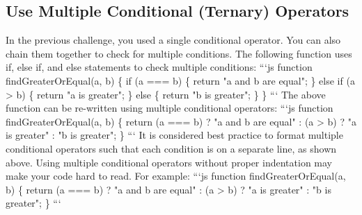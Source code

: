 \documentclass{article}%
\begin{document}
\subsection{Use Multiple Conditional (Ternary) Operators}%
\label{subsec:UseMultipleConditional(Ternary)Operators}%
In the previous challenge, you used a single conditional operator. You can also chain them together to check for multiple conditions.\newline%
The following function uses if, else if, and else statements to check multiple conditions:\newline%
```js\newline%
function findGreaterOrEqual(a, b) \{\newline%
  if (a === b) \{\newline%
    return "a and b are equal";\newline%
  \}\newline%
  else if (a > b) \{\newline%
    return "a is greater";\newline%
  \}\newline%
  else \{\newline%
    return "b is greater";\newline%
  \}\newline%
\}\newline%
```\newline%
The above function can be re{-}written using multiple conditional operators:\newline%
```js\newline%
function findGreaterOrEqual(a, b) \{\newline%
  return (a === b) ? "a and b are equal" \newline%
    : (a > b) ? "a is greater" \newline%
    : "b is greater";\newline%
\}\newline%
```\newline%
It is considered best practice to format multiple conditional operators such that each condition is on a separate line, as shown above. Using multiple conditional operators without proper indentation may make your code hard to read. For example:\newline%
```js\newline%
function findGreaterOrEqual(a, b) \{\newline%
  return (a === b) ? "a and b are equal" : (a > b) ? "a is greater" : "b is greater";\newline%
\}\newline%
```\newline%
\end{document}
